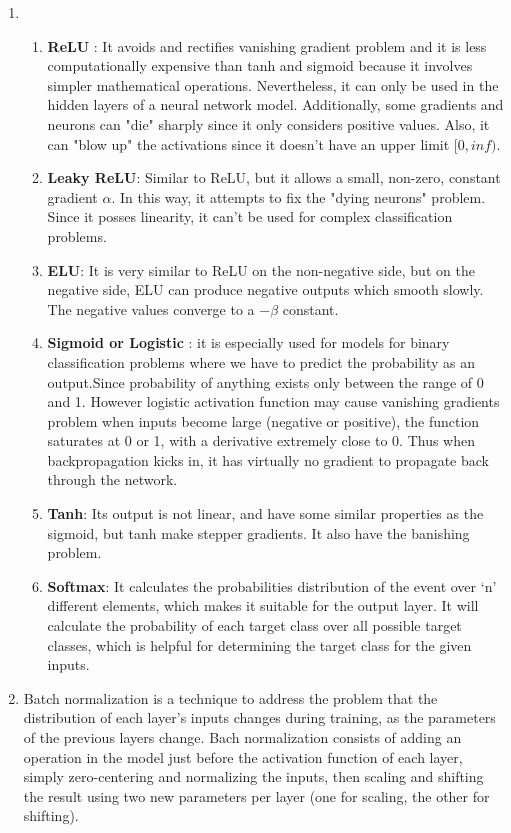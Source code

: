\documentclass[12pt]{article}
\begin{document}
\begin{enumerate}
\item
	\begin{enumerate}
		\item \textbf{ReLU }: It avoids and rectifies vanishing gradient problem and it is less computationally expensive than tanh and sigmoid because it involves simpler mathematical operations. Nevertheless, it can only be used in the hidden layers of a neural network model. Additionally, some gradients and neurons can "die" sharply since it only considers positive values. Also, it can "blow up" the activations since it doesn't have an upper limit $[0,inf)$.
		\item \textbf{Leaky ReLU}: Similar to ReLU, but it allows a small, non-zero, constant gradient $\alpha$. In this way, it attempts to fix the "dying neurons" problem. Since it posses linearity, it can't be used for complex classification problems.
		\item \textbf{ELU}: It is very similar to ReLU on the non-negative side, but on the negative side, ELU can produce negative outputs which smooth slowly. The negative values converge to a $-\beta$ constant.
		\item \textbf{Sigmoid or Logistic} : it is especially used for models for binary classification problems where we have to predict the probability as an output.Since probability of anything exists only between the range of 0 and 1. However logistic activation function may cause vanishing gradients problem when inputs become large (negative or positive), the function saturates at 0 or 1, with a derivative extremely close to 0. Thus when backpropagation kicks in, it has virtually no gradient to propagate back through the network.
		\item \textbf{Tanh}: Its output is not linear, and have some similar properties as the sigmoid, but tanh make stepper gradients. It also have the banishing problem.
		\item \textbf{Softmax}: It calculates the probabilities distribution of the event over ‘n’ different elements, which makes it suitable for the output layer. It will calculate the probability of each target class over all possible target classes, which is helpful for determining the target class for the given inputs.
	\end{enumerate}
\item Batch normalization is a technique to address the problem that the distribution of each layer's inputs changes during training, as the parameters of the previous layers change. 
Bach normalization consists of adding an operation in the model just before the activation function of each layer, simply zero-centering and normalizing the inputs, then scaling and shifting the result using two new parameters per layer (one for scaling, the other for shifting).

\end{enumerate}
\end{document}
